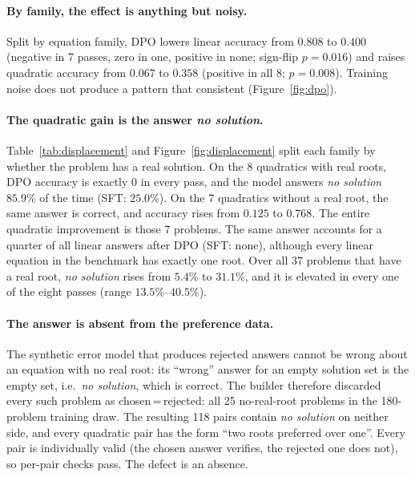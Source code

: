 \documentclass[10pt]{article}
\newcommand{\nosol}{\emph{no solution}}
\begin{document}
\paragraph{By family, the effect is anything but noisy.}
Split by equation family, DPO lowers linear accuracy from $0.808$ to $0.400$ (negative in
7 passes, zero in one, positive in none; sign-flip $p{=}0.016$) and raises quadratic
accuracy from $0.067$ to $0.358$ (positive in all 8; $p{=}0.008$). Training noise does not
produce a pattern that consistent (Figure~\ref{fig:dpo}).

\paragraph{The quadratic gain is the answer \nosol{}.}
Table~\ref{tab:displacement} and Figure~\ref{fig:displacement} split each family by
whether the problem has a real solution. On the 8 quadratics with real roots, DPO
accuracy is exactly $0$ in every pass, and the model answers \nosol{} $85.9\%$ of the
time (SFT: $25.0\%$). On the 7 quadratics without a real root, the same answer is
correct, and accuracy rises from $0.125$ to $0.768$. The entire quadratic improvement is
those 7 problems. The same answer accounts for a quarter of all linear answers after DPO
(SFT: none), although every linear equation in the benchmark has exactly one root. Over
all 37 problems that have a real root, \nosol{} rises from $5.4\%$ to $31.1\%$, and it is
elevated in every one of the eight passes (range $13.5\%$--$40.5\%$).

\paragraph{The answer is absent from the preference data.}
The synthetic error model that produces rejected answers cannot be wrong about an
equation with no real root: its ``wrong'' answer for an empty solution set is the empty
set, i.e.\ \nosol{}, which is correct. The builder therefore discarded every such
problem as chosen\,=\,rejected: all 25 no-real-root problems in the 180-problem
training draw. The resulting 118 pairs contain \nosol{} on neither side, and every
quadratic pair has the form ``two roots preferred over one''. Every pair is individually
valid (the chosen answer verifies, the rejected one does not), so per-pair checks pass.
The defect is an absence.
\end{document}
